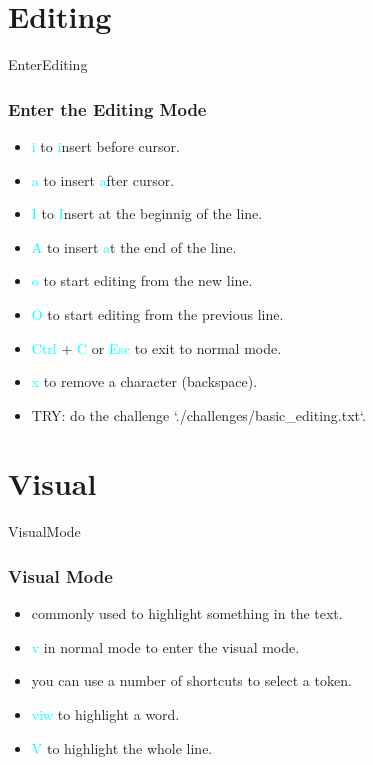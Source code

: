 \documentclass{beamer}
\newcommand{\highlight}[1]{\textcolor{cyan}{\textsf{#1}}}
\begin{document}
\section{Editing}
\begin{frame}{EnterEditing}
    \frametitle{Enter the Editing Mode}
    \begin{itemize}
        \item \highlight{i} to \highlight{i}nsert before cursor.
        \item \highlight{a} to insert \highlight{a}fter cursor.
        \item \highlight{I} to \highlight{I}nsert at the beginnig of the line.
        \item \highlight{A} to insert \highlight{a}t the end of the line.
        \item \highlight{o} to start editing from the new line.
        \item \highlight{O} to start editing from the previous line.
        \item \highlight{Ctrl} + \highlight{C} or \highlight{Esc} to exit to normal mode.
        \item \highlight{x} to remove a character (backspace).
        \item TRY: do the challenge `./challenges/basic\_editing.txt`.
    \end{itemize}
\end{frame}

\section{Visual}
\begin{frame}{VisualMode}
    \frametitle{Visual Mode}
    \begin{itemize}
        \item commonly used to highlight something in the text.
        \item \highlight{v} in normal mode to enter the visual mode.
        \item you can use a number of shortcuts to select a token.
        \item \highlight{viw} to highlight a word.
        \item \highlight{V} to highlight the whole line.
    \end{itemize}
\end{frame}
\end{document}
